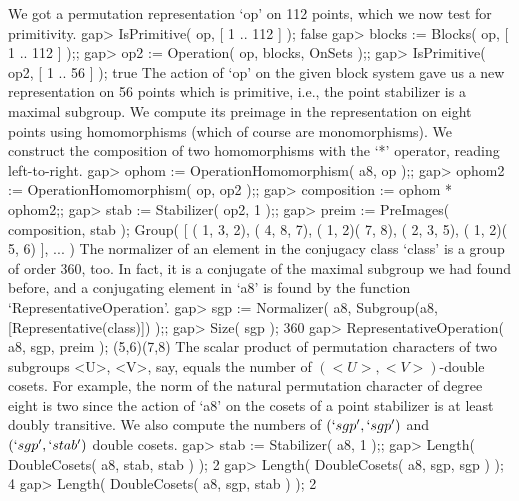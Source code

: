 We got a permutation representation `op' on 112 points, which we now test
for primitivity.
\beginexample
    gap> IsPrimitive( op, [ 1 .. 112 ] );
    false
    gap> blocks := Blocks( op, [ 1 .. 112 ] );;
    gap> op2 := Operation( op, blocks, OnSets );;
    gap> IsPrimitive( op2, [ 1 .. 56 ] );
    true
\endexample
The action of `op' on the given block system gave us a new representation
on 56 points which is primitive, i.e.,  the point stabilizer is a maximal
subgroup. We compute its preimage  in the representation on eight  points
using homomorphisms (which of course are monomorphisms). We construct the
composition  of  two   homomorphisms   with the  `*'  operator,   reading
left-to-right.
\beginexample
    gap> ophom := OperationHomomorphism( a8, op );;
    gap> ophom2 := OperationHomomorphism( op, op2 );;
    gap> composition := ophom * ophom2;;
    gap> stab := Stabilizer( op2, 1 );;
    gap> preim := PreImages( composition, stab );
    Group( [ ( 1, 3, 2), ( 4, 8, 7), ( 1, 2)( 7, 8), ( 2, 3, 5), 
      ( 1, 2)( 5, 6) ], ... )
\endexample
The normalizer of an element in the conjugacy class `class' is a group of
order 360, too. In fact, it is a conjugate of the maximal subgroup we had
found before, and a conjugating element in `a8'  is found by the function
`RepresentativeOperation'.
\beginexample
    gap> sgp := Normalizer( a8, Subgroup(a8,[Representative(class)]) );;
    gap> Size( sgp );
    360
    gap> RepresentativeOperation( a8, sgp, preim );
    (5,6)(7,8)
\endexample
The scalar product  of permutation characters  of two subgroups <U>, <V>,
say, equals  the number  of $(<U>,<V>)$-double  cosets. For example,  the
norm of  the natural permutation character of  degree  eight is two since
the action of `a8' on the cosets of a point stabilizer is at least doubly
transitive. We   also   compute  the   numbers  of    $(`sgp',`sgp')$ and
$(`sgp',`stab')$ double cosets.
\beginexample
    gap> stab := Stabilizer( a8, 1 );;
    gap> Length( DoubleCosets( a8, stab, stab ) );
    2
    gap> Length( DoubleCosets( a8, sgp, sgp ) );
    4
    gap> Length( DoubleCosets( a8, sgp, stab ) );
    2
\endexample

